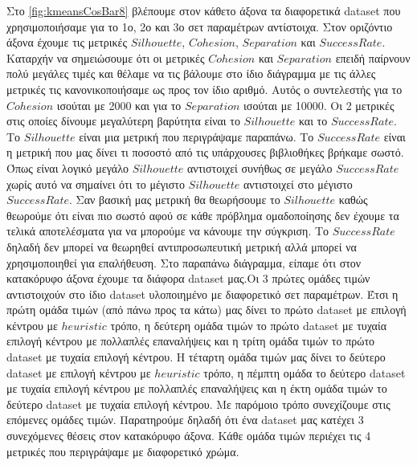 Στο \hyperref[fig:kmeansCosBar8]{\figurename{} \ref{fig:kmeansCosBar8}}
βλέπουμε στον κάθετο άξονα τα διαφορετικά dataset που χρησιμοποιήσαμε για το 1ο, 2ο και 3ο σετ παραμέτρων αντίστοιχα. Στον οριζόντιο άξονα έχουμε τις μετρικές $Silhouette$, $Cohesion$, $Separation$ και $Success Rate$. Καταρχήν να σημειώσουμε ότι οι μετρικές $Cohesion$ και $Separation$ επειδή παίρνουν πολύ μεγάλες τιμές και θέλαμε να τις βάλουμε στο ίδιο διάγραμμα με τις άλλες μετρικές τις κανονικοποιήσαμε ως προς τον ίδιο αριθμό. Αυτός ο συντελεστής για το $Cohesion$ ισούται με 2000 και για το $Separation$ ισούται με 10000. 
Οι 2 μετρικές στις οποίες δίνουμε μεγαλύτερη βαρύτητα είναι το $Silhouette$ και το $Success Rate$. Το $Silhouette$ είναι μια μετρική που περιγράψαμε παραπάνω. Το $Success Rate$ είναι η μετρική που μας δίνει τι ποσοστό από τις υπάρχουσες βιβλιοθήκες βρήκαμε σωστό. Όπως είναι λογικό μεγάλο $Silhouette$ αντιστοιχεί συνήθως σε μεγάλο $Success Rate$ χωρίς αυτό να σημαίνει ότι το μέγιστο $Silhouette$ αντιστοιχεί στο μέγιστο $Success Rate$. Σαν βασική μας μετρική θα θεωρήσουμε το $Silhouette$ καθώς θεωρούμε ότι είναι πιο σωστό αφού σε κάθε πρόβλημα ομαδοποίησης δεν έχουμε τα τελικά αποτελέσματα για να μπορούμε να κάνουμε την σύγκριση. Το $Success Rate$ δηλαδή δεν μπορεί να θεωρηθεί αντιπροσωπευτική μετρική αλλά μπορεί να χρησιμοποιηθεί για επαλήθευση. 
Στο παραπάνω διάγραμμα, είπαμε ότι στον κατακόρυφο άξονα έχουμε τα διάφορα dataset μας.Οι 3 πρώτες ομάδες τιμών αντιστοιχούν στο ίδιο dataset υλοποιημένο με διαφορετικό σετ παραμέτρων. Έτσι η πρώτη ομάδα τιμών (από πάνω προς τα κάτω) μας δίνει το πρώτο dataset με επιλογή κέντρου με $heuristic$ τρόπο, η δεύτερη ομάδα τιμών το πρώτο dataset με τυχαία επιλογή κέντρου με πολλαπλές επαναλήψεις και η τρίτη ομάδα τιμών το πρώτο dataset με τυχαία επιλογή κέντρου. Η τέταρτη ομάδα τιμών μας δίνει το δεύτερο dataset με επιλογή κέντρου με $heuristic$ τρόπο, η πέμπτη ομάδα το δεύτερο dataset  με τυχαία επιλογή κέντρου με πολλαπλές επαναλήψεις και η έκτη ομάδα τιμών το δεύτερο dataset με τυχαία επιλογή κέντρου. Με παρόμοιο τρόπο συνεχίζουμε στις επόμενες ομάδες τιμών. Παρατηρούμε δηλαδή ότι ένα dataset μας κατέχει 3 συνεχόμενες θέσεις στον κατακόρυφο άξονα.
Κάθε ομάδα τιμών περιέχει τις 4 μετρικές που περιγράψαμε με διαφορετικό χρώμα.

